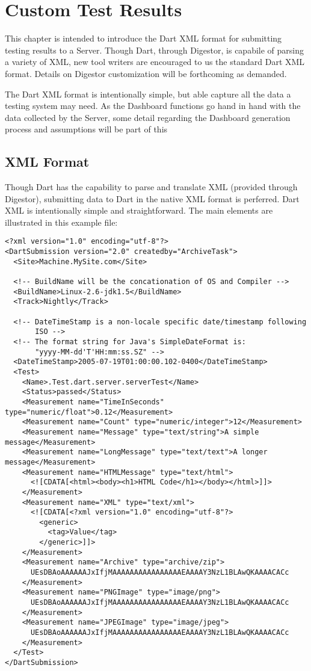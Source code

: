 \documentclass{InsightBook}
\begin{document}
\chapter{Custom Test Results}
This chapter is intended to introduce the Dart XML format for
submitting testing results to a Server.  Though Dart, through
Digestor, is capabile of parsing a variety of XML, new tool writers
are encouraged to us the standard Dart XML format.  Details on
Digestor customization will be forthcoming as demanded.

The Dart XML format is intentionally simple, but able capture all the
data a testing system may need.  As the Dashboard functions go hand in
hand with the data collected by the Server, some detail regarding the
Dashboard generation process and assumptions will be part of this

\section{XML Format}
Though Dart has the capability to parse and translate XML (provided
through Digestor), submitting data to Dart in the native XML format is
 perferred.  Dart XML is intentionally simple and straightforward.
The main elements are illustrated in this example file:

\begin{verbatim}
<?xml version="1.0" encoding="utf-8"?>
<DartSubmission version="2.0" createdby="ArchiveTask">
  <Site>Machine.MySite.com</Site>
  
  <!-- BuildName will be the concationation of OS and Compiler -->
  <BuildName>Linux-2.6-jdk1.5</BuildName>
  <Track>Nightly</Track>
  
  <!-- DateTimeStamp is a non-locale specific date/timestamp following
       ISO -->
  <!-- The format string for Java's SimpleDateFormat is:
       "yyyy-MM-dd'T'HH:mm:ss.SZ" -->
  <DateTimeStamp>2005-07-19T01:00:00.102-0400</DateTimeStamp>
  <Test>
    <Name>.Test.dart.server.serverTest</Name>
    <Status>passed</Status>
    <Measurement name="TimeInSeconds" type="numeric/float">0.12</Measurement>
    <Measurement name="Count" type="numeric/integer">12</Measurement>
    <Measurement name="Message" type="text/string">A simple message</Measurement>
    <Measurement name="LongMessage" type="text/text">A longer message</Measurement>
    <Measurement name="HTMLMessage" type="text/html">
      <![CDATA[<html><body><h1>HTML Code</h1></body></html>]]>
    </Measurement>
    <Measurement name="XML" type="text/xml">
      <![CDATA[<?xml version="1.0" encoding="utf-8"?>
        <generic>
          <tag>Value</tag>
        </generic>]]>
    </Measurement>
    <Measurement name="Archive" type="archive/zip">
      UEsDBAoAAAAAAJxIfjMAAAAAAAAAAAAAAAAEAAAAY3NzL1BLAwQKAAAACACc
    </Measurement>
    <Measurement name="PNGImage" type="image/png">
      UEsDBAoAAAAAAJxIfjMAAAAAAAAAAAAAAAAEAAAAY3NzL1BLAwQKAAAACACc
    </Measurement>
    <Measurement name="JPEGImage" type="image/jpeg">
      UEsDBAoAAAAAAJxIfjMAAAAAAAAAAAAAAAAEAAAAY3NzL1BLAwQKAAAACACc
    </Measurement>
  </Test>
</DartSubmission>
\end{verbatim}
\end{document}
